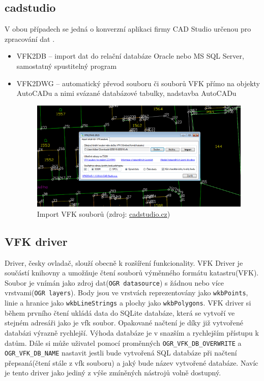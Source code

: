 \subsection{cadstudio}
V obou případech se jedná o konverzní aplikaci firmy CAD Studio určenou pro zpracování dat .
\begin{itemize}
\item VFK2DB -- import dat do relační databáze Oracle nebo MS SQL Server, samostatný spustitelný program \cite{vfk2db} %
\item VFK2DWG -- automatický převod souboru či souborů VFK přímo na objekty AutoCADu a nimi svázané databázové tabulky, nadstavba AutoCADu \cite{vfk2dwg}

\begin{figure}[H]
	 \centering
      \includegraphics[width=14cm]{./pictures/vfk2dwg.png}
      \caption{Import VFK souborů (zdroj:
\href{http://www.cadstudio.cz/img/vfk2dwg11.gif}{cadstudio.cz})}
      \label{fig:iskn studio}
  \end{figure}
\end{itemize}
\subsection{ VFK driver} 
Driver, česky ovladač, slouží obecně k rozšíření funkcionality. VFK Driver je součástí knihovny  a umožňuje čtení souborů výměnného formátu katastru(VFK). Soubor  je vnímán jako zdroj dat(\verb|OGR datasource|) s žádnou nebo více vrstvami(\verb|OGR layers|). Body jsou ve vrstvách reprezentovány jako \verb|wkbPoints|, linie a hranice jako \verb|wkbLineStrings| a plochy jako \verb|wkbPolygons|. VFK driver si během prvního čtení ukládá data do SQLite databáze, která se vytvoří ve stejném adresáři jako je vfk soubor. Opakované načtení je díky již vytvořené databázi výrazně rychlejší. Výhoda databáze je v snazším a rychlejším přístupu k datům. Dále si může uživatel pomocí proměnných \verb|OGR_VFK_DB_OVERWRITE| a \verb|OGR_VFK_DB_NAME| nastavit jestli bude vytvořená SQL databáze při načtení přepsaná(čtení stále z vfk souboru) a jaký bude název vytvořené databáze. Navíc je tento driver jako jediný z výše zmíněných nástrojů volně dostupný. \cite{vfk_driver}

